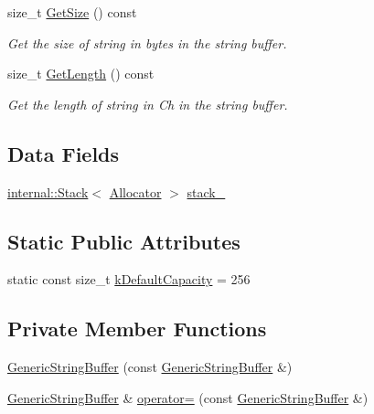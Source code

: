 \begin{DoxyCompactItemize}
\item 
size\+\_\+t \mbox{\hyperlink{classrapidjson_1_1_generic_string_buffer_a9d830ec37a4ba0fba3b523c90aaf8b42}{Get\+Size}} () const
\begin{DoxyCompactList}\small\item\em Get the size of string in bytes in the string buffer. \end{DoxyCompactList}\item 
size\+\_\+t \mbox{\hyperlink{classrapidjson_1_1_generic_string_buffer_a0a114be213152d570a2d9fde7a28fe11}{Get\+Length}} () const
\begin{DoxyCompactList}\small\item\em Get the length of string in Ch in the string buffer. \end{DoxyCompactList}\end{DoxyCompactItemize}
\subsection*{Data Fields}
\begin{DoxyCompactItemize}
\item 
\mbox{\hyperlink{classrapidjson_1_1internal_1_1_stack}{internal\+::\+Stack}}$<$ \mbox{\hyperlink{classrapidjson_1_1_allocator}{Allocator}} $>$ \mbox{\hyperlink{classrapidjson_1_1_generic_string_buffer_a061b1ffdcd0d660d98ab4a8e3ab49975}{stack\+\_\+}}
\end{DoxyCompactItemize}
\subsection*{Static Public Attributes}
\begin{DoxyCompactItemize}
\item 
static const size\+\_\+t \mbox{\hyperlink{classrapidjson_1_1_generic_string_buffer_a56159d25a431109a2873e9455178eff0}{k\+Default\+Capacity}} = 256
\end{DoxyCompactItemize}
\subsection*{Private Member Functions}
\begin{DoxyCompactItemize}
\item 
\mbox{\hyperlink{classrapidjson_1_1_generic_string_buffer_aad265ddd331096e501d0ec577afa441f}{Generic\+String\+Buffer}} (const \mbox{\hyperlink{classrapidjson_1_1_generic_string_buffer}{Generic\+String\+Buffer}} \&)
\item 
\mbox{\hyperlink{classrapidjson_1_1_generic_string_buffer}{Generic\+String\+Buffer}} \& \mbox{\hyperlink{classrapidjson_1_1_generic_string_buffer_af183e859f15b23e59afe2cad176b81ed}{operator=}} (const \mbox{\hyperlink{classrapidjson_1_1_generic_string_buffer}{Generic\+String\+Buffer}} \&)
\end{DoxyCompactItemize}


